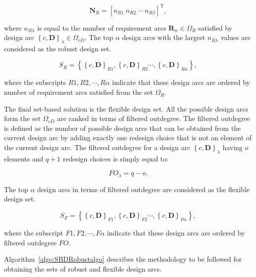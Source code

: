 \begin{equation} \label{eq:robustnessvec}
	\mathbf{N}_R = \left[n_{R1} ~ n_{R2} ~ \cdots ~ n_{R\beta}\right]^{\mathrm{T}},
\end{equation}

where $n_{R\lambda}$ is equal to the number of requirement arcs $\mathbf{R}_w \in \Omega_R$ satisfied by design arc $\left\{c,\mathbf{D}\right\}_\lambda \in \Omega_{cD}$. The top $\alpha$ design arcs with the largest $n_{R\lambda}$ values are considered as the robust design set.

\begin{equation} \label{eq:SBDrobust}
	S_R = \left\{\left\{c,\mathbf{D}\right\}_{R1},\left\{c,\mathbf{D}\right\}_{R2}\cdots,\left\{c,\mathbf{D}\right\}_{R\alpha}\right\},
\end{equation}

where the subscripts $R1,R2,\cdots,R\alpha$ indicate that these design arcs are ordered by number of requirement arcs satisfied from the set $\Omega_R$.

The final set-based solution is the flexible design set. All the possible design arcs form the set $\Omega_{cD}$ are ranked in terms of filtered outdegree. The filtered outdegree is defined as the number of possible design arcs that can be obtained from the current design arc by adding exactly one redesign choice that is not an element of the current design arc. The filtered outdegree for a design arc $\left\{c,\mathbf{D}\right\}_\lambda$ having $o$ elements and $q + 1$ redesign choices is simply equal to:

\begin{equation} \label{eq:filteredoutdegree}
	FO_{\lambda} = q - o.
\end{equation}

The top $\alpha$ design arcs in terms of filtered outdegree are considered as the flexible design set.

\begin{equation} \label{eq:SBDflexible}
	S_F = \left\{\left\{c,\mathbf{D}\right\}_{F1},\left\{c,\mathbf{D}\right\}_{F2}\cdots,\left\{c,\mathbf{D}\right\}_{F\alpha}\right\},
\end{equation}

where the subscript $F1,F2,\cdots,F\alpha$ indicate that these design arcs are ordered by filtered outdegree $FO$.

Algorithm~\ref{algo:SBDRobustalgo} describes the methodology to be followed for obtaining the sets of robust and flexible design arcs.

